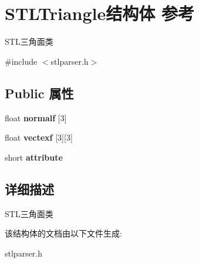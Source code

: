 \hypertarget{struct_s_t_l_triangle}{}\section{S\+T\+L\+Triangle结构体 参考}
\label{struct_s_t_l_triangle}


S\+T\+L三角面类  




{\ttfamily \#include $<$stlparser.\+h$>$}

\subsection*{Public 属性}
\begin{DoxyCompactItemize}
\item 
\hypertarget{struct_s_t_l_triangle_a4f39da57ad9dd1fa066d639948189606}{}float {\bfseries normalf} \mbox{[}3\mbox{]}\label{struct_s_t_l_triangle_a4f39da57ad9dd1fa066d639948189606}

\item 
\hypertarget{struct_s_t_l_triangle_abfcf2f7138257e8c28892e5a80724861}{}float {\bfseries vectexf} \mbox{[}3\mbox{]}\mbox{[}3\mbox{]}\label{struct_s_t_l_triangle_abfcf2f7138257e8c28892e5a80724861}

\item 
\hypertarget{struct_s_t_l_triangle_aacd20be52a2449627fcc38ad82a9dbeb}{}short {\bfseries attribute}\label{struct_s_t_l_triangle_aacd20be52a2449627fcc38ad82a9dbeb}

\end{DoxyCompactItemize}


\subsection{详细描述}
S\+T\+L三角面类 

该结构体的文档由以下文件生成\+:\begin{DoxyCompactItemize}
\item 
stlparser.\+h\end{DoxyCompactItemize}
